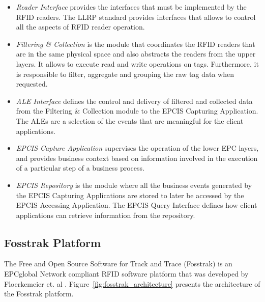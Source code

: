 \begin{itemize}
  \item \textit{Reader Interface} provides the interfaces that must be implemented by the \gls{RFID} readers.
  The \gls{LLRP} standard provides interfaces that allows to control all the aspects of \gls{RFID}
  reader operation.
  \item \textit{Filtering \& Collection} is the module that coordinates the \gls{RFID} readers that are in the
  same physical space and also abstracts the readers from the upper layers. It allows to execute read
  and write operations on tags. Furthermore, it is responsible to filter, aggregate and grouping the
  raw tag data when requested.
  \item \textit{\gls{ALE} Interface} defines the control and delivery of filtered and collected data from the
  Filtering \&  Collection module to the \gls{EPCIS} Capturing Application. The \glspl{ALE} are a selection of
  the events that are meaningful for the client applications.
  \item \textit{EPCIS Capture Application} supervises the operation of the lower EPC layers, and provides
  business context based on information involved in the execution of a particular step of a business
  process.
  \item \textit{EPCIS Repository} is the module where all the business events generated by the
  EPCIS Capturing Applications are stored to later be accessed by the EPCIS Accessing Application.
  The EPCIS Query Interface defines how client applications can retrieve information from the repository.
\end{itemize}

\subsection{Fosstrak Platform}
\label{sub:fosstrak}
The Free and Open Source Software for Track and Trace (Fosstrak) is an EPCglobal Network compliant
\gls{RFID} software platform that was developed by Floerkemeier et. al \cite{floerkemeier2007rfid}.
Figure~\ref{fig:fosstrak_architecture} presents the architecture of the Fosstrak platform.

